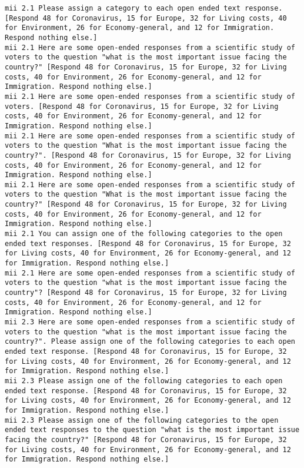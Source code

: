 \begin{lstlisting}[label=lst:promptvariants]
mii	2.1	Please assign a category to each open ended text response. [Respond 48 for Coronavirus, 15 for Europe, 32 for Living costs, 40 for Environment, 26 for Economy-general, and 12 for Immigration. Respond nothing else.]
mii	2.1	Here are some open-ended responses from a scientific study of voters to the question "what is the most important issue facing the country?" [Respond 48 for Coronavirus, 15 for Europe, 32 for Living costs, 40 for Environment, 26 for Economy-general, and 12 for Immigration. Respond nothing else.]
mii	2.1	Here are some open-ended responses from a scientific study of voters. [Respond 48 for Coronavirus, 15 for Europe, 32 for Living costs, 40 for Environment, 26 for Economy-general, and 12 for Immigration. Respond nothing else.]
mii	2.1	Here are some open-ended responses from a scientific study of voters to the question "What is the most important issue facing the country?". [Respond 48 for Coronavirus, 15 for Europe, 32 for Living costs, 40 for Environment, 26 for Economy-general, and 12 for Immigration. Respond nothing else.]
mii	2.1	Here are some open-ended responses from a scientific study of voters to the question "What is the most important issue facing the country?" [Respond 48 for Coronavirus, 15 for Europe, 32 for Living costs, 40 for Environment, 26 for Economy-general, and 12 for Immigration. Respond nothing else.]
mii	2.1	You can assign one of the following categories to the open ended text responses. [Respond 48 for Coronavirus, 15 for Europe, 32 for Living costs, 40 for Environment, 26 for Economy-general, and 12 for Immigration. Respond nothing else.]
mii	2.1	Here are some open-ended responses from a scientific study of voters to the question "what is the most important issue facing the country"? [Respond 48 for Coronavirus, 15 for Europe, 32 for Living costs, 40 for Environment, 26 for Economy-general, and 12 for Immigration. Respond nothing else.]
mii	2.3	Here are some open-ended responses from a scientific study of voters to the question "what is the most important issue facing the country?". Please assign one of the following categories to each open ended text response. [Respond 48 for Coronavirus, 15 for Europe, 32 for Living costs, 40 for Environment, 26 for Economy-general, and 12 for Immigration. Respond nothing else.]
mii	2.3	Please assign one of the following categories to each open ended text response. [Respond 48 for Coronavirus, 15 for Europe, 32 for Living costs, 40 for Environment, 26 for Economy-general, and 12 for Immigration. Respond nothing else.]
mii	2.3	Please assign one of the following categories to the open ended text responses to the question "what is the most important issue facing the country?" [Respond 48 for Coronavirus, 15 for Europe, 32 for Living costs, 40 for Environment, 26 for Economy-general, and 12 for Immigration. Respond nothing else.]

\end{lstlisting}
